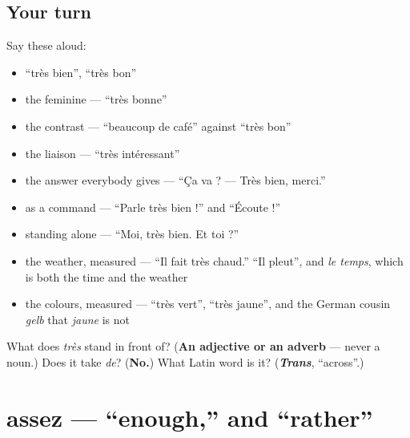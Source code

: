 \subsection*{Your turn}
Say these aloud:

\begin{itemize}
\raggedright
  \item \textquotedblleft{}très bien\textquotedblright{}, \textquotedblleft{}très bon\textquotedblright{}
  \item the feminine — \textquotedblleft{}très bonne\textquotedblright{}
  \item the contrast — \textquotedblleft{}beaucoup de café\textquotedblright{} against \textquotedblleft{}très bon\textquotedblright{}
  \item the liaison — \textquotedblleft{}très intéressant\textquotedblright{}
  \item the answer everybody gives — \textquotedblleft{}Ça va ? — Très bien, merci.\textquotedblright{}
  \item as a command — \textquotedblleft{}Parle très bien !\textquotedblright{} and \textquotedblleft{}Écoute !\textquotedblright{}
  \item standing alone — \textquotedblleft{}Moi, très bien. Et toi ?\textquotedblright{}
  \item the weather, measured — \textquotedblleft{}Il fait très chaud.\textquotedblright{} \textquotedblleft{}Il pleut\textquotedblright{}, and \emph{le temps}, which is both the time and the weather
  \item the colours, measured — \textquotedblleft{}très vert\textquotedblright{}, \textquotedblleft{}très jaune\textquotedblright{}, and the German cousin \emph{gelb} that \emph{jaune} is not
\end{itemize}

\begin{tcolorbox}[breakable,colback=teal!4,colframe=teal!35!black,title={Before you move on}]
What does \emph{très} stand in front of? (\textbf{An adjective or an adverb} — never a noun.) Does it take \emph{de}? (\textbf{No.}) What Latin word is it? (\emph{\textbf{Trans}}, \textquotedblleft{}across\textquotedblright{}.)
\end{tcolorbox}
\section[assez]{assez — \textquotedblleft{}enough,\textquotedblright{} and \textquotedblleft{}rather\textquotedblright{}}

